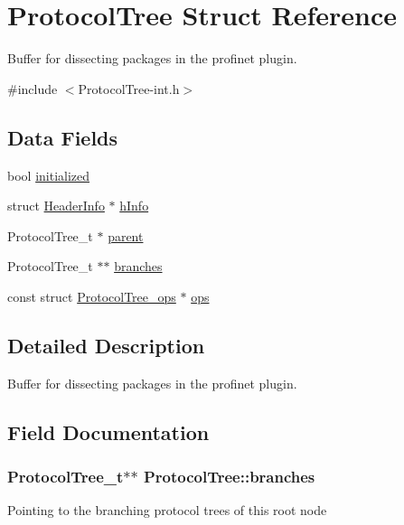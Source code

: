 \hypertarget{struct_protocol_tree}{}\section{Protocol\+Tree Struct Reference}
\label{struct_protocol_tree}


Buffer for dissecting packages in the profinet plugin.  




{\ttfamily \#include $<$Protocol\+Tree-\/int.\+h$>$}

\subsection*{Data Fields}
\begin{DoxyCompactItemize}
\item 
bool \hyperlink{struct_protocol_tree_a6d4f209acc4331cbb440df967d7a4054}{initialized}
\item 
struct \hyperlink{struct_header_info}{Header\+Info} $\ast$ \hyperlink{struct_protocol_tree_a8fce6fc18afa7ddd1fa4f8895064d1ba}{h\+Info}
\item 
Protocol\+Tree\+\_\+t $\ast$ \hyperlink{struct_protocol_tree_a4d7aa1ac9fb932c4a4a7ebc140066ab1}{parent}
\item 
Protocol\+Tree\+\_\+t $\ast$$\ast$ \hyperlink{struct_protocol_tree_aab7be83543870f7313efbec39b72385f}{branches}
\item 
const struct \hyperlink{struct_protocol_tree__ops}{Protocol\+Tree\+\_\+ops} $\ast$ \hyperlink{struct_protocol_tree_aad4c24f365eae4e59887dc5753a0d891}{ops}
\end{DoxyCompactItemize}


\subsection{Detailed Description}
Buffer for dissecting packages in the profinet plugin. 

\subsection{Field Documentation}
\hypertarget{struct_protocol_tree_aab7be83543870f7313efbec39b72385f}{}
\subsubsection[{branches}]{\setlength{\rightskip}{0pt plus 5cm}Protocol\+Tree\+\_\+t$\ast$$\ast$ Protocol\+Tree\+::branches}\label{struct_protocol_tree_aab7be83543870f7313efbec39b72385f}
Pointing to the branching protocol trees of this root node \hypertarget{struct_protocol_tree_a8fce6fc18afa7ddd1fa4f8895064d1ba}{}
